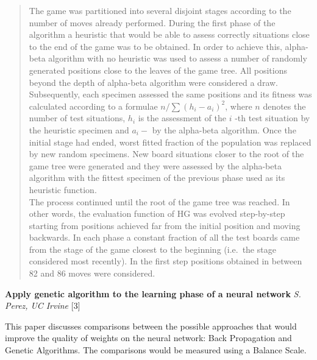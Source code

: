 \documentclass[]{article}
\begin{document}
\begin{quote}
The game was partitioned into several disjoint stages according to the
number of moves already performed. During the first phase of the
algorithm a heuristic that would be able to assess correctly situations
close to the end of the game was to be obtained. In order to achieve
this, alpha-beta algorithm with no heuristic was used to assess a number
of randomly generated positions close to the leaves of the game tree.
All positions beyond the depth of alpha-beta algorithm were considered a
draw. \\
Subsequently, each specimen assessed the same positions and its
fitness was calculated according to a formulae
\begin{math}n/\sum (h_i - a_i )^2\end{math}, where \begin{math}n\end{math} denotes the number of test
situations, \begin{math}h_i\end{math} is the assessment of the \begin{math}i\end{math} -th test situation by
the heuristic specimen and \begin{math}a_i-\end{math} by the alpha-beta algorithm. Once
the initial stage had ended, worst fitted fraction of the population was
replaced by new random specimens. New board situations closer to the
root of the game tree were generated and they were assessed by the
alpha-beta algorithm with the fittest specimen of the previous phase
used as its heuristic function. 
\\The process continued until the root of
the game tree was reached. In other words, the evaluation function of HG
was evolved step-by-step starting from positions achieved far from the
initial position and moving backwards. In each phase a constant fraction
of all the test boards came from the stage of the game closest to the
beginning (i.e.~the stage considered most recently). In the first step
positions obtained in between 82 and 86 moves were considered.
\end{quote}

\textbf{Apply genetic algorithm to the learning phase of a neural
network} \emph{S. Perez, UC Irvine} {[}3{]}

This paper discusses comparisons between the possible approaches that
would improve the quality of weights on the neural network: Back
Propagation and Genetic Algorithms. The comparisons would be measured
using a Balance Scale.
\end{document}
